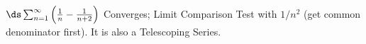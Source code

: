 {$\ds\sum_{n=1}^\infty \left(\frac1n-\frac1{n+2}\right)$
}
{Converges; Limit Comparison Test with $1/n^2$ (get common denominator first). It is also a Telescoping Series.
}